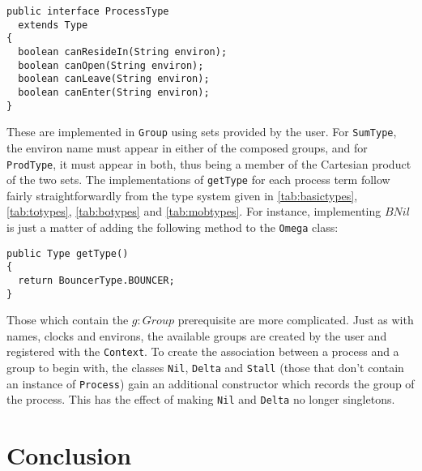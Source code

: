 \begin{verbatim}
public interface ProcessType
  extends Type
{
  boolean canResideIn(String environ);
  boolean canOpen(String environ);
  boolean canLeave(String environ);
  boolean canEnter(String environ);
}
\end{verbatim}

These are implemented in \texttt{Group} using sets provided by the
user.  For \texttt{SumType}, the environ name must appear in either of
the composed groups, and for \texttt{ProdType}, it must appear in
both, thus being a member of the Cartesian product of the two sets.
The implementations of \texttt{getType} for each process term follow
fairly straightforwardly from the type system given in
\ref{tab:basictypes}, \ref{tab:totypes}, \ref{tab:botypes} and
\ref{tab:mobtypes}.  For instance, implementing $BNil$ is just a
matter of adding the following method to the \texttt{Omega} class:

\begin{verbatim}
public Type getType()
{
  return BouncerType.BOUNCER;
}
\end{verbatim}

Those which contain the $g : Group$ prerequisite are more complicated.
Just as with names, clocks and environs, the available groups are
created by the user and registered with the \texttt{Context}.  To
create the association between a process and a group to begin with,
the classes \texttt{Nil}, \texttt{Delta} and \texttt{Stall} (those
that don't contain an instance of \texttt{Process}) gain an additional
constructor which records the group of the process.  This has the
effect of making \texttt{Nil} and \texttt{Delta} no longer singletons.


\section{Conclusion}
